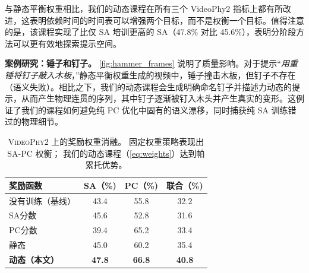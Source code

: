 与静态平衡权重相比，我们的动态课程在所有三个 VideoPhy2 指标上都有所改进，这表明依赖时间的时间表可以增强两个目标，而不是权衡一个目标。值得注意的是，该课程实现了比仅 SA 培训更高的 SA（47.8\% 对比 45.6\%），表明分阶段方法可以更有效地探索提示空间。

\noindent\textbf{案例研究：锤子和钉子。}
\cref{fig:hammer_frames} 说明了质量影响。对于提示“\textit{用重锤将钉子敲入木板}，”静态平衡权重生成的视频中，锤子撞击木板，但钉子不存在（语义失败）。相比之下，我们的动态课程会生成明确命名钉子并描述力动态的提示，从而产生物理连贯的序列，其中钉子逐渐被钉入木头并产生真实的变形。这例证了我们的课程如何避免纯 PC 优化中固有的语义漂移，同时捕获纯 SA 训练错过的物理细节。



\begin{table}[t]
  \centering
  \caption{\textsc{VideoPhy2} 上的奖励权重消融。
           固定权重策略表现出 SA-PC 权衡；
           我们的动态课程（\cref{eq:weights}）达到帕累托优势。}
  \label{tab:reward_ablation}
  \vspace{0.05in}
  \small
  \begin{tabular}{lccc}
    \toprule
    \textbf{奖励函数} & \textbf{SA（\%)} & \textbf{PC（\%)} & \textbf{联合（\%)} \\
    \midrule
    没有训练（基线）     & 43.4 & 55.8 & 32.2 \\
    \midrule
    SA分数              & 45.6 & 52.8 & 31.6 \\
    PC分数              & 39.4 & 65.2 & 33.4 \\
    静态         & 45.0 & 60.2 & 35.4 \\
    \midrule
    \textbf{动态（本文）}    & \textbf{47.8} & \textbf{66.8} & \textbf{40.8} \\
    \bottomrule
  \end{tabular}
\end{table}
